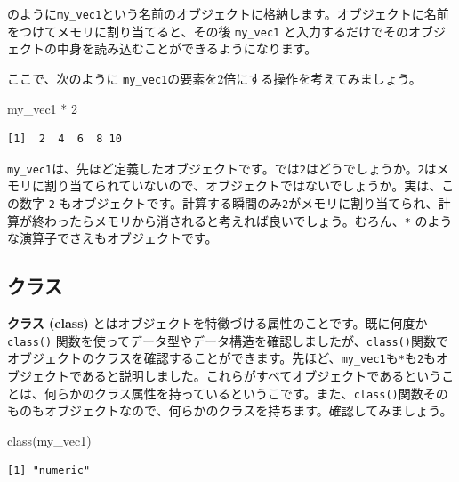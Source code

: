 \documentclass[
  a4paper,
  pandoc,
  ja=standard,
  jafont=haranoaji]{bxjsbook}
\newenvironment{Shaded}{\begin{snugshade}}{\end{snugshade}}
\newcommand{\DecValTok}[1]{\textcolor[rgb]{0.68,0.00,0.00}{#1}}
\newcommand{\FunctionTok}[1]{\textcolor[rgb]{0.28,0.35,0.67}{#1}}
\newcommand{\NormalTok}[1]{\textcolor[rgb]{0.00,0.48,0.65}{#1}}
\newcommand{\SpecialCharTok}[1]{\textcolor[rgb]{0.37,0.37,0.37}{#1}}
\begin{document}
のように\texttt{my\_vec1}という名前のオブジェクトに格納します。オブジェクトに名前をつけてメモリに割り当てると、その後
\texttt{my\_vec1}
と入力するだけでそのオブジェクトの中身を読み込むことができるようになります。

ここで、次のように
\texttt{my\_vec1}の要素を2倍にする操作を考えてみましょう。

\begin{Shaded}
\begin{Highlighting}[numbers=left,,]
\NormalTok{my\_vec1 }\SpecialCharTok{*} \DecValTok{2}
\end{Highlighting}
\end{Shaded}

\begin{verbatim}
[1]  2  4  6  8 10
\end{verbatim}

\texttt{my\_vec1}は、先ほど定義したオブジェクトです。では\texttt{2}はどうでしょうか。\texttt{2}はメモリに割り当てられていないので、オブジェクトではないでしょうか。実は、この数字
\texttt{2}
もオブジェクトです。計算する瞬間のみ\texttt{2}がメモリに割り当てられ、計算が終わったらメモリから消されると考えれば良いでしょう。むろん、\texttt{*}
のような演算子でさえもオブジェクトです。

\hypertarget{ux30afux30e9ux30b9-1}{%
\subsection{クラス}\label{ux30afux30e9ux30b9-1}}

\textbf{クラス (class)}
とはオブジェクトを特徴づける属性のことです。既に何度か \texttt{class()}
関数を使ってデータ型やデータ構造を確認しましたが、\texttt{class()}関数でオブジェクトのクラスを確認することができます。先ほど、\texttt{my\_vec1}も\texttt{*}も\texttt{2}もオブジェクトであると説明しました。これらがすべてオブジェクトであるということは、何らかのクラス属性を持っているというこです。また、\texttt{class()}関数そのものもオブジェクトなので、何らかのクラスを持ちます。確認してみましょう。

\begin{Shaded}
\begin{Highlighting}[numbers=left,,]
\FunctionTok{class}\NormalTok{(my\_vec1)}
\end{Highlighting}
\end{Shaded}

\begin{verbatim}
[1] "numeric"
\end{verbatim}
\end{document}
